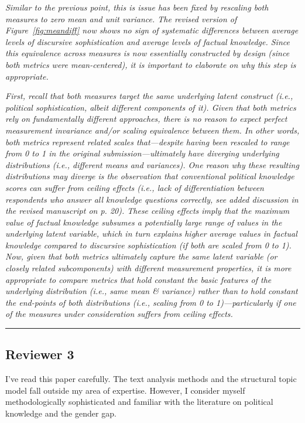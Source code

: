 \textit{Similar to the previous point, this is issue has been fixed by rescaling both measures to zero mean and unit variance. The revised version of Figure~\ref{fig:meandiff} now shows no sign of systematic differences between average levels of discursive sophistication and average levels of factual knowledge. Since this equivalence across measures is now essentially constructed by design (since both metrics were mean-centered), it is important to elaborate on why this step is appropriate.}

\textit{First, recall that both measures target the same underlying latent construct (i.e., political sophistication, albeit different components of it). Given that both metrics rely on fundamentally different approaches, there is no reason to expect perfect measurement invariance and/or scaling equivalence between them. In other words, both metrics represent related scales that---despite having been rescaled to range from 0 to 1 in the original submission---ultimately have diverging underlying distributions (i.e., different means and variances). One reason why these resulting distributions may diverge is the observation that conventional political knowledge scores can suffer from ceiling effects (i.e., lack of differentiation between respondents who answer all knowledge questions correctly, see added discussion in the revised manuscript on p. 20). These ceiling effects imply that the maximum value of factual knowledge subsumes a potentially large range of values in the underlying latent variable, which in turn explains higher average values in factual knowledge compared to discursive sophistication (if both are scaled from 0 to 1). Now, given that both metrics ultimately capture the same latent variable (or closely related subcomponents) with different measurement properties, it is more appropriate to compare metrics that hold constant the basic features of the underlying distribution (i.e., same mean \& variance) rather than to hold constant the end-points of both distributions (i.e., scaling from 0 to 1)---particularly if one of the measures under consideration suffers from ceiling effects.}


\rule{\linewidth}{.01cm}


\subsection*{Reviewer 3}

I’ve read this paper carefully. The text analysis methods and the structural topic model fall outside my area of expertise. However, I consider myself methodologically sophisticated and familiar with the literature on political knowledge and the gender gap.

